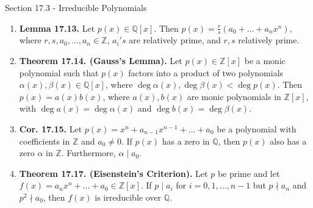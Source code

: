 \documentclass[12pt]{article}
\theoremstyle{definition}
\theoremstyle{named}
\begin{document}
\begin{section}{Section 17.3 - Irreducible Polynomials}
    \begin{enumerate}
        \item \textbf{Lemma 17.13. } Let $p(x) \in \mathbb{Q}[x]$. Then $p(x) = \frac{r}{s}(a_0 + \dots + a_nx^n)$, where $r,s,a_0,\dots,a_n \in \mathbb{Z}$, $a_i's$ are relatively prime, and $r,s$ relatively prime. 
        \item \textbf{Theorem 17.14. (Gauss's Lemma). } Let $p(x) \in \mathbb{Z}[x]$ be a monic polynomial such that $p(x)$ factors into a product of two polynomials $\alpha(x),\beta(x) \in \mathbb{Q}[x]$, where $\deg\alpha(x), \deg\beta(x) < \deg p(x)$. Then $p(x) = a(x)b(x)$, where $a(x),b(x)$ are monic polynomials in $\mathbb{Z}[x]$, with $\deg a(x) = \deg\alpha(x)$ and $\deg b(x) = \deg\beta(x)$.  
        \item \textbf{Cor. 17.15. } Let $p(x) = x^n + a_{n-1}x^{n-1} + \dots + a_0$ be a polynomial with coefficients in $\mathbb{Z}$ and $a_0 \neq 0$. If $p(x)$ has a zero in $\mathbb{Q}$, then $p(x)$ also has a zero $\alpha$ in $\mathbb{Z}$. Furthermore, $\alpha \mid a_0$. 
        \item \textbf{Theorem 17.17. (Eisenstein's Criterion). } Let $p$ be prime and let $f(x) = a_nx^n + \dots + a_0 \in \mathbb{Z}[x]$. If $p \mid a_i$ for $i=0,1,\dots,n-1$ but $p \nmid a_n$ and $p^2 \nmid a_0$, then $f(x)$ is irreducible over $\mathbb{Q}$. 
    \end{enumerate}
\end{section}
\end{document}
